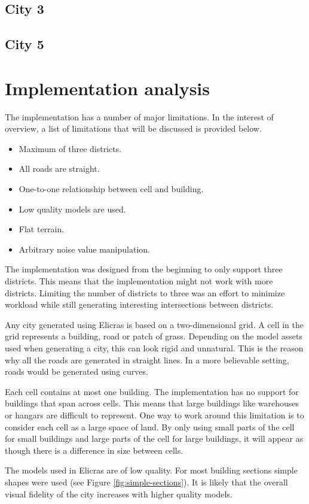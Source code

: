 	\subsection{City 3}
	\subsection{City 5}
	
\section{Implementation analysis}
The implementation has a number of major limitations. In the interest of overview, a list of limitations that will be discussed is provided below.
	
\begin{itemize}
	\item Maximum of three districts.
	\item All roads are straight.
	\item One-to-one relationship between cell and building.
	\item Low quality models are used.
	\item Flat terrain.
	\item Arbitrary noise value manipulation.
\end{itemize}
	
The implementation was designed from the beginning to only support three districts. This means that the implementation might not work with more districts. Limiting the number of districts to three was an effort to minimize workload while still generating interesting intersections between districts.
\par
Any city generated using Elicras is based on a two-dimensional grid. A cell in the grid represents a building, road or patch of grass. Depending on the model assets used when generating a city, this can look rigid and unnatural. This is the reason why all the roads are generated in straight lines. In a more believable setting, roads would be generated using curves\cite{CurvedRoads}.
\par
Each cell contains at most one building. The implementation has no support for buildings that span across cells. This means that large buildings like warehouses or hangars are difficult to represent. One way to work around this limitation is to consider each cell as a large space of land. By only using small parts of the cell for small buildings and large parts of the cell for large buildings, it will appear as though there is a difference in size between cells.
\par
The models used in Elicras are of low quality. For most building sections simple shapes were used (see Figure \ref{fig:simple-sections}). It is likely that the overall visual fidelity of the city increases with higher quality models.

